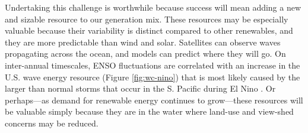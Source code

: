 Undertaking this challenge is worthwhile because success will mean adding a new and sizable resource to our generation mix. These resources may be especially valuable because their variability is distinct compared to other renewables, and they are more predictable than wind and solar. Satellites can observe waves propagating across the ocean, and models can predict where they will go. On inter-annual timescales, ENSO fluctuations are correlated with an increase in the U.S. wave energy resource (Figure \ref{fig:wc-nino}) that is most likely caused by the larger than normal storms that occur in the S. Pacific during El Nino \citep{andersonClimateIndexOptimized2018, yangCharacteristicsVariabilityNearshore2020, ruggieroNationalAssessmentShoreline2013}. Or perhaps—as demand for renewable energy continues to grow—these resources will be valuable simply because they are in the water where land-use and view-shed concerns may be reduced.

